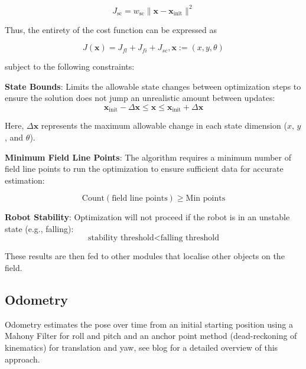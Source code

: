 \documentclass{llncs}
\begin{document}
\[
J_{\text{sc}} = w_{\text{sc}} \|\mathbf{x} - \mathbf{x}_{\text{init}}\|^2
\]

Thus, the entirety of the cost function can be expressed as

\[
J(\mathbf{x}) = J_{fl} + J_{fi} + J_{sc}, \mathbf{x}:=(x,y,\theta)
\]

subject to the following constraints:\newline

\textbf{State Bounds}: Limits the allowable state changes between optimization steps to ensure the solution does not jump an unrealistic amount between updates:
\[
\mathbf{x}_{\text{init}} - \Delta \mathbf{x} \leq \mathbf{x} \leq \mathbf{x}_{\text{init}} + \Delta \mathbf{x}
\]

Here, \( \Delta \mathbf{x} \) represents the maximum allowable change in each state dimension (\(x\), \(y\), and \( \theta \)).\newline

\textbf{Minimum Field Line Points}: The algorithm requires a minimum number of field line points to run the optimization to ensure sufficient data for accurate estimation:

\[
\text{Count}(\text{field line points}) \geq \text{Min points}
\]

\textbf{Robot Stability}: Optimization will not proceed if the robot is in an unstable state (e.g., falling):
\[
\text{stability threshold} < \text{falling threshold}
\]

These results are then fed to other modules that localise other objects on the field.

\subsection{Odometry}
Odometry estimates the pose over time from an initial starting position using a Mahony Filter \cite{Mahony2008} for roll and pitch and an anchor point method (dead-reckoning of kinematics) for translation and yaw, see blog \cite{CaronFloating} for a detailed overview of this approach.

\end{document}
